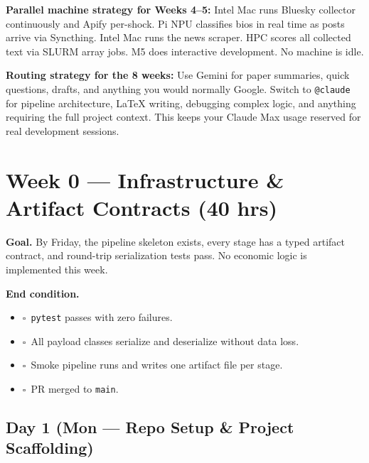 \documentclass[11pt]{article}
\newcommand{\dayhead}[2]{%
  \subsection*{Day #1 \normalfont\small\color{codegray}(#2)}}
\newcommand{\done}{\textcolor{sectionblue}{$\square$}\ }
\begin{document}
\begin{mdframed}[backgroundcolor=warn, linecolor=darkblue, linewidth=0.8pt,
  innerleftmargin=10pt, innerrightmargin=10pt, innertopmargin=6pt,
  innerbottommargin=6pt]
\textbf{Parallel machine strategy for Weeks 4--5:} Intel Mac runs Bluesky collector
continuously and Apify per-shock. Pi NPU classifies bios in real time as posts arrive
via Syncthing. Intel Mac runs the news scraper. HPC scores all collected text via
SLURM array jobs. M5 does interactive development. No machine is idle.
\end{mdframed}

\begin{mdframed}[backgroundcolor=warn, linecolor=darkblue, linewidth=0.8pt,
  innerleftmargin=10pt, innerrightmargin=10pt, innertopmargin=6pt,
  innerbottommargin=6pt]
\textbf{Routing strategy for the 8 weeks:} Use Gemini for paper summaries,
quick questions, drafts, and anything you would normally Google. Switch to
\texttt{@claude} for pipeline architecture, LaTeX writing, debugging complex
logic, and anything requiring the full project context. This keeps your Claude
Max usage reserved for real development sessions.
\end{mdframed}

\section{Week 0 --- Infrastructure \& Artifact Contracts (40 hrs)}

\textbf{Goal.} By Friday, the pipeline skeleton exists, every stage has a typed
artifact contract, and round-trip serialization tests pass. No economic logic is
implemented this week.

\textbf{End condition.}
\begin{itemize}[leftmargin=1.6em, itemsep=1pt]
  \item \done \texttt{pytest} passes with zero failures.
  \item \done All payload classes serialize and deserialize without data loss.
  \item \done Smoke pipeline runs and writes one artifact file per stage.
  \item \done PR merged to \texttt{main}.
\end{itemize}

\dayhead{1}{Mon --- Repo Setup \& Project Scaffolding}
\end{document}
